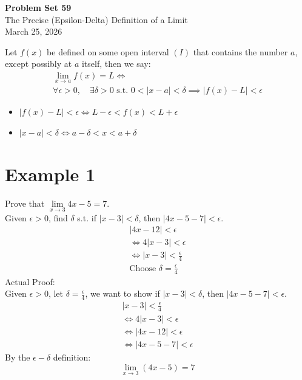 \documentclass[12pt]{article}
\newcommand{\theorem}[2]{\begin{tcolorbox}[title={#1},colback=blue!5!white,colframe=blue!75!black,parbox=false] #2 \end{tcolorbox}}
\begin{document}
\vspace*{0cm}

\begin{center}
    {\Large \bfseries Problem Set 59} \\[0.5cm]
    {\large The Precise (Epsilon-Delta) Definition of a Limit} \\[0.35cm]
    {\normalsize March 25, 2026}
\end{center}


\theorem{Epsilon-Delta Definition of a Limit}{
Let $f(x)$ be defined on some open interval $(I)$ that contains the number $a$, except possibly at $a$ itself, then we say:
\begin{gather*}
    \lim_{x \to a} f(x) = L \iff\\
    \forall \epsilon >0, \quad \exists \delta > 0 \text{ s.t. } 0<|x-a|<\delta \implies |f(x)-L|< \epsilon
\end{gather*}
\begin{itemize}
    \item $|f(x)-L|< \epsilon \iff L-\epsilon < f(x) < L+\epsilon$
    \item $|x-a|<\delta \iff a-\delta < x < a + \delta$
\end{itemize}
}

\section{Example 1}
Prove that $\lim\limits_{x \to 3} 4x-5=7$.\\
Given $\epsilon > 0$, find $\delta$ s.t. if $|x-3|<\delta$, then $|4x-5-7|<\epsilon$.
\begin{gather*}
    |4x-12|<\epsilon\\
    \iff 4|x-3|<\epsilon\\
    \iff |x-3|<\frac{\epsilon}{4}\\
    \boxed{\text{Choose } \delta=\frac{\epsilon}{4}}
\end{gather*}
Actual Proof:\\
Given $\epsilon > 0$, let $\delta=\frac{\epsilon}{4}$, we want to show if $|x-3|<\delta$, then $|4x-5-7|<\epsilon$.
\begin{gather*}
    |x-3|<\frac{\epsilon}{4}\\
    \iff 4|x-3|<\epsilon\\
    \iff |4x-12|<\epsilon\\
    \iff |4x-5-7|<\epsilon
\end{gather*}
By the $\epsilon-\delta$ definition:
\[
\boxed{\lim_{x\to 3} (4x-5) = 7}
\]
\end{document}

